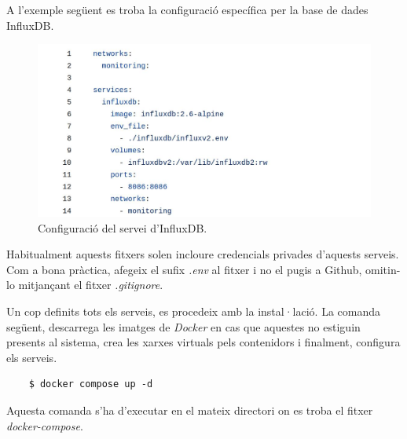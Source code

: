 \clearpage

\noindent
A l'exemple següent es troba la configuració específica per la base de dades InfluxDB.

\begin{figure}[htbp]
    \centerline{\includegraphics[width=\textwidth]{figures/docker-compose-influxdb}}
    \captionsetup{justification=centering}
    \caption{Configuració del servei d'InfluxDB.}\label{fig:docker-compose-influxdb}
\end{figure}

\begin{tcolorbox}[colback=yellow!5!white, colframe=blue!75!black, title=Fitxers de configuració]
    Habitualment aquests fitxers solen incloure credencials privades d'aquests serveis.
    Com a bona pràctica, afegeix el sufix \textit{.env} al fitxer i no el pugis a Github, omitin-lo mitjançant el fitxer \textit{.\gls{gitignore}}.
\end{tcolorbox}
\vspace{1em}

\noindent
Un cop definits tots els serveis, es procedeix amb la instal·lació.
La comanda següent, descarrega les imatges de \textit{\gls{Docker}} en cas que aquestes no estiguin presents al sistema,
crea les xarxes virtuals pels contenidors i finalment, configura els serveis.

\begin{verbatim}
    $ docker compose up -d
\end{verbatim}

\begin{tcolorbox}[colback=yellow!5!white, colframe=red!75!black, title=Atenció]
    Aquesta comanda s'ha d'executar en el mateix directori on es troba el fitxer \textit{\gls{docker-compose}}.
\end{tcolorbox}

